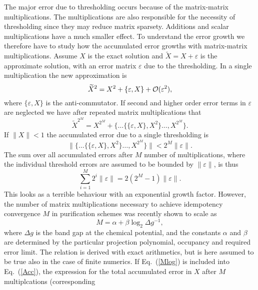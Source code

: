 \commentoutA{\documentclass[superbib,aps,prb,epsfig,floats,twocolumn]{revtex4}}
\begin{document}
The major error due to thresholding occurs because of the matrix-matrix
multiplications. The multiplications are also responsible for the
necessity of thresholding since they may reduce matrix sparsety.
Additions and scalar multiplications have a much smaller effect.
To understand the error growth we therefore have to study how
the accumulated error growths with matrix-matrix multiplications.
Assume $X$ is the exact solution and ${\widetilde X} = X + \varepsilon$ is
the approximate solution, with an error matrix $\varepsilon$ due to the
thresholding. In a single multiplication the  new approximation is
\begin{equation}
{\widetilde X}^2 = X^2 + \{ \varepsilon,X \} + {\cal O}(\varepsilon^2),
\end{equation}
where $\{ \varepsilon,X \}$ is the anti-commutator. If second and higher
order error terms in $\varepsilon$ are neglected we have after repeated
matrix multiplications that
\begin{equation}
{\widetilde X}^{2^M} = X^{2^M} + \{ \ldots \{\{ \varepsilon,X \},X^2 \} \ldots,X^{2^M}\}.
\end{equation}
If $\| X \| < 1$ the accumulated error due to a single thresholding is
\begin{equation}
\| \{ \ldots \{\{ \varepsilon,X \},X^2 \} \ldots,X^{2^M}\} \| < 2^M \|\varepsilon\|.
\end{equation}
The sum over all accumulated errors after $M$ number of multiplications, where
the individual threshold errors are assumed to be bounded by $\|\varepsilon\|$, is thus
\begin{equation}
\label{Acc}
\sum_{i=1}^{M} 2^i \|\varepsilon\| = 2(2^M-1)\|\varepsilon\|.
\end{equation}
This looks as a terrible behaviour with an exponential growth factor. However,
the number of matrix multiplications necessary to achieve idempotency convergence $M$
in purification schemes was recently shown to scale as \cite{Niklasson02b}
\begin{equation}
\label{Mlog}
M = \alpha + \beta \log_2 \Delta g^{-1},
\end{equation}
where $\Delta g$ is the band gap at the chemical potential, and
the constants $\alpha$ and $\beta$ are determined by the particular
projection polynomial, occupancy and required error limit.
The relation is derived with exact arithmetics, but is here assumed to
be true also in the case of finite numerics.
If Eq.\ (\ref{Mlog}) is included into Eq.\ (\ref{Acc}), the expression for the total
accumulated error in $X$ after $M$ multiplcations (corresponding
\end{document}
